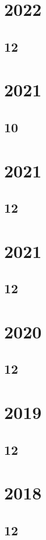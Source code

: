 \documentclass[11pt]{book}
\begin{document}
\section{2022}
\subsection{12}

\section{2021}
\subsection{10}

\section{2021}
\subsection{12}

\section{2021}
\subsection{12}

\section{2020}
\subsection{12}

\section{2019}
\subsection{12}





\section{2018}
\subsection{12}



\end{document}
